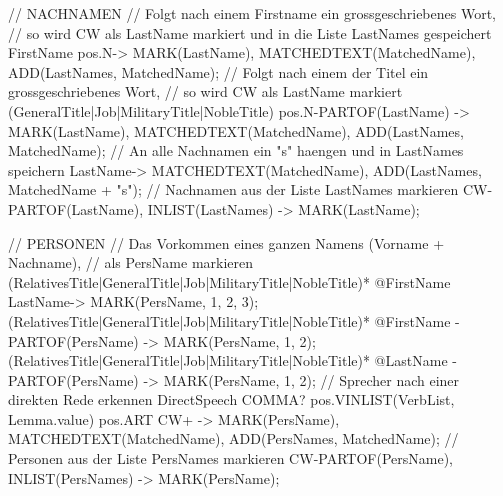\documentclass{article}
\begin{document}
\begin{Ruta}[caption={Das finale Skript Name.ruta.}\label{final_rules}]
// NACHNAMEN
// Folgt nach einem Firstname ein grossgeschriebenes Wort,
// so wird CW als LastName markiert und in die Liste LastNames gespeichert
FirstName pos.N{->
MARK(LastName), MATCHEDTEXT(MatchedName), ADD(LastNames, MatchedName)};
// Folgt nach einem der Titel ein grossgeschriebenes Wort,
// so wird CW als LastName markiert
(GeneralTitle|Job|MilitaryTitle|NobleTitle) pos.N{-PARTOF(LastName)
-> MARK(LastName), MATCHEDTEXT(MatchedName), ADD(LastNames, MatchedName)};
// An alle Nachnamen ein "s" haengen und in LastNames speichern
LastName{-> MATCHEDTEXT(MatchedName), ADD(LastNames, MatchedName + "s")};
// Nachnamen aus der Liste LastNames markieren
CW{-PARTOF(LastName), INLIST(LastNames) -> MARK(LastName)};

// PERSONEN
// Das Vorkommen eines ganzen Namens (Vorname + Nachname),
// als PersName markieren
(RelativesTitle|GeneralTitle|Job|MilitaryTitle|NobleTitle)* @FirstName
LastName{-> MARK(PersName, 1, 2, 3)};
(RelativesTitle|GeneralTitle|Job|MilitaryTitle|NobleTitle)* @FirstName
{-PARTOF(PersName) -> MARK(PersName, 1, 2)};
(RelativesTitle|GeneralTitle|Job|MilitaryTitle|NobleTitle)* @LastName
{-PARTOF(PersName) -> MARK(PersName, 1, 2)};
// Sprecher nach einer direkten Rede erkennen
DirectSpeech COMMA? pos.V{INLIST(VerbList, Lemma.value)} pos.ART CW+
{-> MARK(PersName), MATCHEDTEXT(MatchedName), ADD(PersNames, MatchedName)};
// Personen aus der Liste PersNames markieren
CW{-PARTOF(PersName), INLIST(PersNames) -> MARK(PersName)};
\end{Ruta}

\newpage
\end{document}
